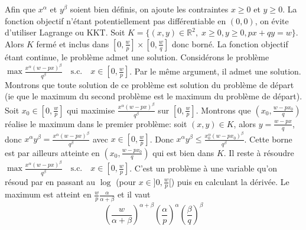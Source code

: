 \documentclass{report}
\begin{document}
\subsection{} \noindent\fbox{
\parbox{\linewidth}{
Soient $\alpha\in ]0,1[$, $\beta\in ]0,1[$, $p>0$, $q>0$ et $w>0$.\newline
Résoudre $\max x^\alpha y^\beta \quad \text{s.c.} \quad px+qy=w$
}}\\ 
\\ 
\\
\noindent Afin que $x^\alpha$ et $y^\beta$ soient bien définis, on ajoute les contraintes $x\geq 0$ et $y\geq 0$. La fonction objectif n'étant potentiellement pas différentiable en $(0,0)$, on évite d'utiliser Lagrange ou KKT.\newline
\newline
Soit $K=\{(x,y)\in \mathbb R^2,\; x\geq 0, y\geq 0, px+qy=w\}$. Alors $K$ fermé et inclus dans $[0,\frac wp]\times [0,\frac wq]$ donc borné. La fonction objectif étant continue, le problème admet une solution.\newline
\newline
Considérons le problème $\max \frac{x^\alpha (w-px)^\beta}{q^\beta}\quad \text{s.c.} \quad x\in [0,\frac wp]$. Par le même argument, il admet une solution. Montrons que toute solution de ce problème est solution du problème de départ (ie que le maximum du second problème est le maximum du problème de départ). \newline
Soit $x_0\in [0,\frac wp]$ qui maximise $\frac{x^\alpha (w-px)^\beta}{q^\beta}$ sur $[0,\frac wp]$. Montrons que $(x_0,\frac{w-px_0}{q})$ réalise le maximum dans le premier problème: soit $(x,y)\in K$, alors $y=\frac{w-px}{q}$, donc $x^\alpha y^\beta=\frac{x^\alpha (w-px)^\beta}{q^\beta}$ avec $x\in [0,\frac wp]$. Donc $x^\alpha y^\beta\leq \frac{x_0^\alpha (w-px_0)^\beta}{q^\beta}$. Cette borne est par ailleurs atteinte en $(x_0,\frac{w-px_0}{q})$ qui est bien dans $K$.\newline
\newline
Il reste à résoudre $\max \frac{x^\alpha (w-px)^\beta}{q^\beta}\quad \text{s.c.} \quad x\in [0,\frac wp]$. C'est un problème à une variable qu'on résoud par en passant au $\log$ (pour $x\in ]0,\frac wp[$) puis en calculant la dérivée.\newline
Le maximum est atteint en $\frac{w}{p} \frac{\alpha}{\alpha+\beta}$ et il vaut $$\left(\frac{w}{\alpha + \beta} \right)^{\alpha + \beta} \left(\frac{\alpha}{p} \right)^{\alpha} \left(\frac{\beta}{q} \right)^{\beta}$$
\end{document}
